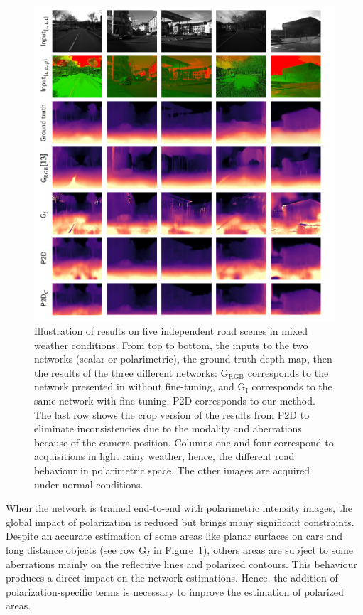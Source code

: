 \begin{figure}[!ht]
	\centering
	\includegraphics[keepaspectratio,width=.8\linewidth]{Figures/ECCV/results2}
	\caption[Illustration of results on five independent road scenes in mixed weather conditions.]{Illustration of results on five independent road scenes in mixed weather conditions. From top to bottom, the inputs to the two networks (scalar or polarimetric), the ground truth depth map, then the results of the three different networks: G$_{\textrm{RGB}}$ corresponds to the network presented in \cite{godard2019digging} without fine-tuning, and G$_{\textrm{I}}$ corresponds to the same network with fine-tuning. P2D corresponds to our method.
		The last row shows the crop version of the results from P2D to eliminate inconsistencies due to the modality and aberrations because of the camera position. Columns one and four correspond to acquisitions in light rainy weather, hence, the different road behaviour in polarimetric space. The other images are acquired under normal conditions.\vspace{.5cm}}
	\label{fig:res}
	
\end{figure}





When the network is trained end-to-end with polarimetric intensity images, the global impact of polarization is reduced but brings many significant constraints. Despite an accurate estimation of some areas like planar surfaces on cars and long distance objects (see row G$_I$ in Figure~\ref{fig:res}), others areas are subject to some aberrations mainly on the reflective lines and polarized contours. This behaviour produces a direct impact on the network estimations.
Hence, the addition of polarization-specific terms is necessary to improve the estimation of polarized areas.

